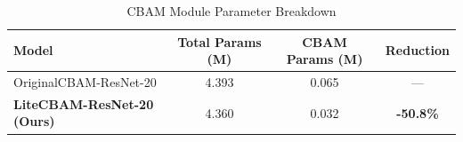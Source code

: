 \begin{table}[ht]
\centering
\caption{CBAM Module Parameter Breakdown}
\label{tab:param_compare}
\begin{tabular}{lccc}
\toprule
\textbf{Model} & \textbf{Total Params (M)} & \textbf{CBAM Params (M)} & \textbf{Reduction} \\
\midrule
OriginalCBAM-ResNet-20 & 4.393 & 0.065 & --- \\
\textbf{LiteCBAM-ResNet-20 (Ours)} & 4.360 & 0.032 & \textbf{-50.8\%} \\
\bottomrule
\end{tabular}
\end{table}
